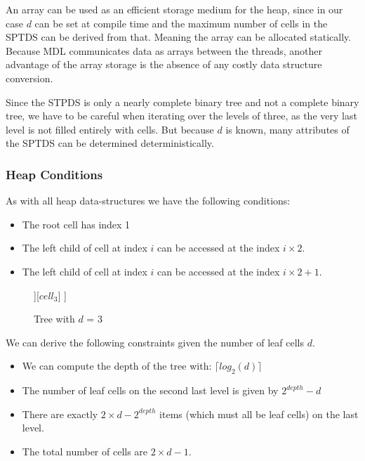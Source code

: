 \documentclass[]{article}
\begin{document}
An array can be used as an efficient storage medium for the heap, since in our case $d$ can be set at compile time and the maximum number of cells in the SPTDS can be derived from that. Meaning the array can be allocated statically.
Because MDL communicates data as arrays between the threads, another advantage of the array storage is the absence of any costly data structure conversion. 

Since the STPDS is only a nearly complete binary tree and not a complete binary tree, we have to be careful when iterating over the levels of three, as the very last level is not filled entirely with cells. But because $d$ is known, many attributes of the SPTDS can be determined deterministically.

\subsubsection{Heap Conditions}
As with all heap data-structures we have the following conditions:

\begin{itemize}
	\item The root cell has index 1
	\item The left child of cell at index $i$ can be accessed at the index $i\times2$. 
	\item The left child of cell at index $i$ can be accessed at the index $i\times2 + 1$. 
\end{itemize}

\begin{figure}[H]
	\centering
	\begin{forest}
		[$cell_1$
		[$cell_2$ [$cell_4$] [$cell_5$]][$cell_3$]  
		]
	\end{forest}
	\caption{Tree with $d$ = 3}
	\label{fig:extree}
\end{figure}

\vspace{0.5cm}
We can derive the following constraints given the number of leaf cells $d$. 

\begin{itemize}
	\item We can compute the depth of the tree with: $\lceil log_2(d) \rceil$
	\item The number of leaf cells on the second last level is given by $2^{depth} - d$ 
	\item There are exactly $2 \times d - 2^{depth}$ items (which must all be leaf cells) on the last level. 
	\item The total number of cells are $2\times d - 1$.
\end{itemize}
\end{document}
